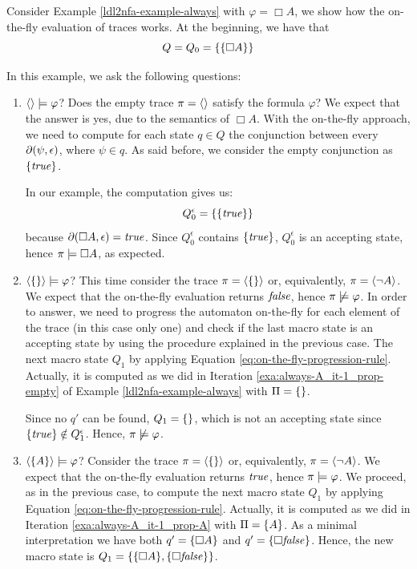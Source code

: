 \begin{example}\label{exa:on-the-fly-always-A}
	Consider Example \ref{ldl2nfa-example-always} with $\varphi = \Box A$, we show how the on-the-fly evaluation of traces works.
	At the beginning, we have that $$Q = Q_0 = \{\{\Box A\}\}$$

	In this example, we ask the following questions:
	\begin{enumerate}
		\item $\langle  \rangle \models \varphi$? Does the empty trace $\pi = \langle  \rangle$ satisfy the formula $\varphi$? We expect that the answer is yes, due to the semantics of $\Box A$. With the on-the-fly approach, we need to compute for each \NFA state $q \in Q$ the conjunction between every $\partial\lparen \psi, \epsilon\rparen$, where $\psi \in q$. As said before, we consider the empty conjunction as $\{\mathit{true}\}$.
		
		In our example, the computation gives us:
		$$Q_0^\epsilon = \{\{\mathit{true}\}\}$$
		because $\partial\lparen \Box A, \epsilon\rparen = \mathit{true}$.
		Since $Q_0^\epsilon$ contains $\{\mathit{true}\}$, $Q_0^\epsilon$ is an accepting state, hence $\pi \models \Box A$, as expected.
		
		\item $\langle \{\} \rangle \models \varphi$? This time consider the trace $\pi = \langle \{\} \rangle$ or, equivalently, $\pi = \langle \lnot A \rangle$. We expect that the on-the-fly evaluation returns $\mathit{false}$, hence $\pi \not \models \varphi$. In order to answer, we need to progress the automaton on-the-fly for each element of the trace (in this case only one) and check if the last macro state is an accepting state by using the procedure explained in the previous case.
		The next macro state $Q_1$ by applying Equation \ref{eq:on-the-fly-progression-rule}. Actually, it is computed as we did in Iteration \ref{exa:always-A_it-1_prop-empty} of Example \ref{ldl2nfa-example-always} with $\Pi = \{\}$. 
		
		Since no $q'$ can be found, $Q_1 = \{\}$, which is not an accepting state since $\{\mathit{true}\} \notin Q_1^\epsilon$. Hence, $\pi \not \models \varphi$.\label{exa:on-the-fly-always-A-trace-empty}
		
		\item $\langle \{A\} \rangle \models \varphi$? Consider the trace $\pi = \langle \{\} \rangle$ or, equivalently, $\pi = \langle \lnot A \rangle$. We expect that the on-the-fly evaluation returns $\mathit{true}$, hence $\pi \models \varphi$. We proceed, as in the previous case, to compute the next macro state $Q_1$ by applying Equation \ref{eq:on-the-fly-progression-rule}. Actually, it is computed as we did in Iteration \ref{exa:always-A_it-1_prop-A} with $\Pi = \{A\}$. As a minimal interpretation we have both $q' = \{\Box A\}$ and $q' = \{\Box \mathit{false}\}$. Hence, the new macro state is $Q_1 = \{\{\Box A\}, \{\Box \mathit{false}\}\}$.
		

\end{enumerate}
\end{example}
